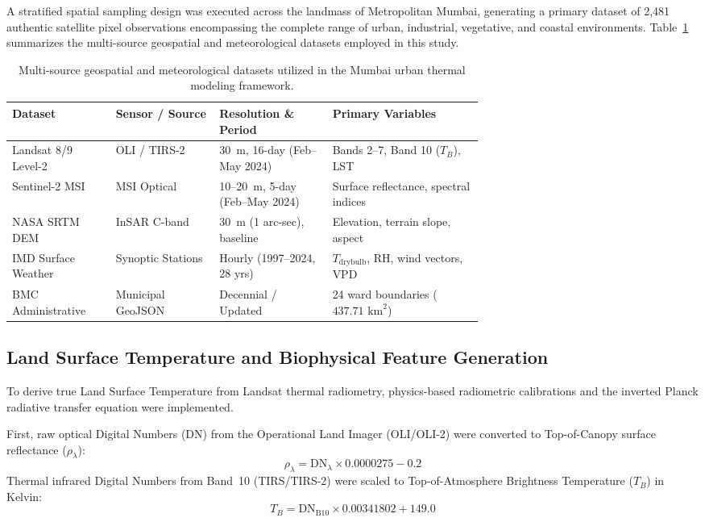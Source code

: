 \documentclass[a4paper,fleqn]{cas-sc}
\begin{document}
A stratified spatial sampling design was executed across the landmass of Metropolitan Mumbai, generating a primary dataset of 2,481 authentic satellite pixel observations encompassing the complete range of urban, industrial, vegetative, and coastal environments. Table~\ref{tab:datasets} summarizes the multi-source geospatial and meteorological datasets employed in this study.

\begin{table}
\caption{Multi-source geospatial and meteorological datasets utilized in the Mumbai urban thermal modeling framework.}
\label{tab:datasets}
\footnotesize
\begin{tabularx}{\linewidth}{@{}p{0.22\linewidth} p{0.22\linewidth} p{0.24\linewidth} X@{}}
\toprule
Dataset & Sensor / Source & Resolution \& Period & Primary Variables \\
\midrule
Landsat 8/9 Level-2 & OLI / TIRS-2 & 30~m, 16-day (Feb--May 2024) & Bands 2--7, Band 10 ($T_B$), LST \\
Sentinel-2 MSI & MSI Optical & 10--20~m, 5-day (Feb--May 2024) & Surface reflectance, spectral indices \\
NASA SRTM DEM & InSAR C-band & 30~m (1 arc-sec), baseline & Elevation, terrain slope, aspect \\
IMD Surface Weather & Synoptic Stations & Hourly (1997--2024, 28 yrs) & $T_{\text{drybulb}}$, RH, wind vectors, VPD \\
BMC Administrative & Municipal GeoJSON & Decennial / Updated & 24 ward boundaries ($437.71\text{ km}^2$) \\
\bottomrule
\end{tabularx}
\end{table}

\subsection{Land Surface Temperature and Biophysical Feature Generation}
\label{subsec:biophysical_features}

To derive true Land Surface Temperature from Landsat thermal radiometry, physics-based radiometric calibrations and the inverted Planck radiative transfer equation were implemented.

First, raw optical Digital Numbers ($\text{DN}$) from the Operational Land Imager (OLI/OLI-2) were converted to Top-of-Canopy surface reflectance ($\rho_\lambda$):
\begin{equation}
    \rho_\lambda = \text{DN}_\lambda \times 0.0000275 - 0.2
    \label{eq:optical_cal}
\end{equation}
Thermal infrared Digital Numbers from Band~10 (TIRS/TIRS-2) were scaled to Top-of-Atmosphere Brightness Temperature ($T_B$) in Kelvin:
\begin{equation}
    T_B = \text{DN}_{\text{B10}} \times 0.00341802 + 149.0
    \label{eq:thermal_cal}
\end{equation}
\end{document}
